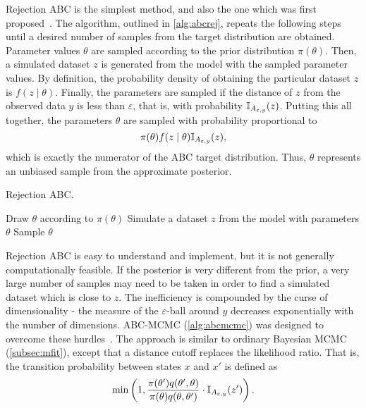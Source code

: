 {Rejection ABC is the simplest method, and also the one which was first
proposed~\autocite{rubin1984bayesianly, tavare1997inferring}. The algorithm,
outlined in \cref{alg:abcrej}, repeats the following steps until a desired
number of samples from the target distribution are obtained. Parameter values
$\theta$ are sampled according to the prior distribution $\pi(\theta)$. Then, a
simulated dataset $z$ is generated from the model with the sampled parameter
values. By definition, the probability density of obtaining the particular
dataset $z$ is $f(z \mid \theta)$. Finally, the parameters are sampled if the
distance of $z$ from the observed data $y$ is less than $\varepsilon$, that is,
with probability $\mathbb{I}_{A_{\varepsilon, y}}(z)$. Putting this all together, the
parameters $\theta$ are sampled with probability proportional to
\[
  \pi(\theta) f(z \mid \theta) \mathbb{I}_{A_{\varepsilon, y}}(z),
\]
which is exactly the numerator of the \gls{ABC} target distribution. Thus,
$\theta$ represents an unbiased sample from the approximate posterior.

\begin{algorithm}
  \caption{Rejection \gls{ABC}.}
  \begin{algorithmic}
    \Loop
      \State Draw $\theta$ according to $\pi(\theta)$
      \State Simulate a dataset $z$ from the model with parameters $\theta$
        \State Sample $\theta$
      \EndIf
    \EndLoop
  \end{algorithmic}
  \label{alg:abcrej}
\end{algorithm}

Rejection \gls{ABC} is easy to understand and implement, but it is not
generally computationally feasible. If the posterior is very different from the
prior, a very large number of samples may need to be taken in order to find a
simulated dataset which is close to $z$. The inefficiency is compounded
by the curse of dimensionality - the measure of the $\varepsilon$-ball around
$y$ decreases exponentially with the number of dimensions.
\gls{ABC}-\gls{MCMC} (\cref{alg:abcmcmc}) was designed to overcome these
hurdles~\autocite{marjoram2003markov}. The approach is similar to ordinary
Bayesian \gls{MCMC} (\cref{subsec:mfit}), except that a distance cutoff
replaces the likelihood ratio. That is, the transition probability between
states $x$ and $x'$ is defined as
\[
  \min\left(1, \frac{\pi(\theta') q(\theta', \theta)}
                    {\pi(\theta) q(\theta, \theta')} 
    \cdot \mathbb{I}_{A_{\varepsilon, y}}(z') \right).
\]

}
